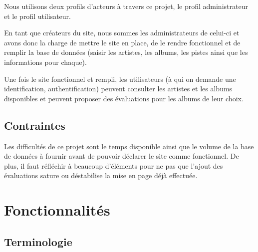   \begin{paragraphe}
    Nous utilisons deux profils d’acteurs à travers ce projet, le profil
    administrateur et le profil utilisateur.\par
    En tant que créateurs du site, nous sommes les administrateurs de celui-ci
    et avons donc la charge de mettre le site en place, de le rendre
    fonctionnel et de remplir la base de données (saisir les artistes, les
    albums, les pistes ainsi que les informations pour chaque).\par
    Une fois le site fonctionnel et rempli, les utilisateurs (à qui on demande
    une identification, authentification) peuvent consulter les artistes et les
    albums disponibles et peuvent proposer des évaluations pour les albums de
    leur choix.
  \end{paragraphe}

  \subsection{Contraintes}

  \begin{paragraphe}
    Les difficultés de ce projet sont le temps disponible ainsi que le volume
    de la base de données à fournir avant de pouvoir déclarer le site comme
    fonctionnel. De plus, il faut réfléchir à beaucoup d’éléments pour ne pas
    que l’ajout des évaluations sature ou déstabilise la mise en page déjà
    effectuée.
  \end{paragraphe}

\section{Fonctionnalités}

  \subsection{Terminologie}


